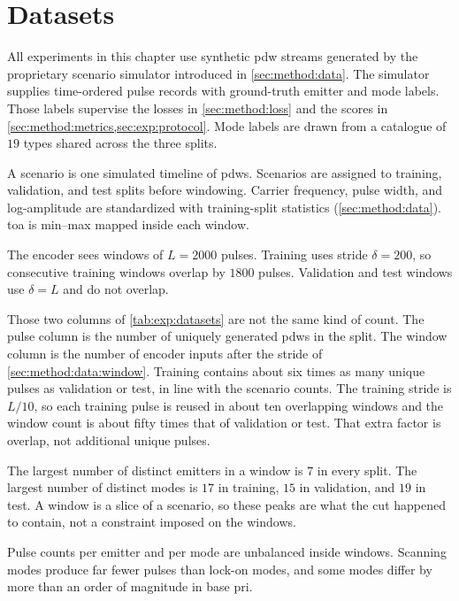 \section{Datasets}\label{sec:exp:datasets}

All experiments in this chapter use synthetic \gls{pdw} streams generated by the proprietary scenario simulator introduced in \cref{sec:method:data}.
The simulator supplies time-ordered pulse records with ground-truth emitter and mode labels.
Those labels supervise the losses in \cref{sec:method:loss} and the scores in \cref{sec:method:metrics,sec:exp:protocol}.
Mode labels are drawn from a catalogue of $19$ types shared across the three splits.

A scenario is one simulated timeline of \glspl{pdw}.
Scenarios are assigned to training, validation, and test splits before windowing.
Carrier frequency, pulse width, and log-amplitude are standardized with training-split statistics (\cref{sec:method:data}).
\Gls{toa} is min--max mapped inside each window.

The encoder sees windows of $L = 2000$ pulses.
Training uses stride $\delta = 200$, so consecutive training windows overlap by $1800$ pulses.
Validation and test windows use $\delta = L$ and do not overlap.

Those two columns of \cref{tab:exp:datasets} are not the same kind of count.
The pulse column is the number of uniquely generated \glspl{pdw} in the split.
The window column is the number of encoder inputs after the stride of \cref{sec:method:data:window}.
Training contains about six times as many unique pulses as validation or test, in line with the scenario counts.
The training stride is $L/10$, so each training pulse is reused in about ten overlapping windows and the window count is about fifty times that of validation or test.
That extra factor is overlap, not additional unique pulses.

The largest number of distinct emitters in a window is $7$ in every split.
The largest number of distinct modes is $17$ in training, $15$ in validation, and $19$ in test.
A window is a slice of a scenario, so these peaks are what the cut happened to contain, not a constraint imposed on the windows.

Pulse counts per emitter and per mode are unbalanced inside windows.
Scanning modes produce far fewer pulses than lock-on modes, and some modes differ by more than an order of magnitude in base \gls{pri}.

